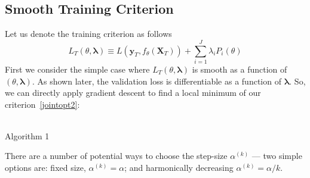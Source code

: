 \documentclass[10pt,letterpaper]{article}
\begin{document}
\subsection{Smooth Training Criterion}
Let us denote the training criterion as follows
\begin{equation}
L_T\left(\theta, \boldsymbol{\lambda}\right) \equiv L(\boldsymbol{y}_T, f_\theta (\boldsymbol{X}_T)) + \sum\limits_{i=1}^J \lambda_i P_i(\theta)
\label{train}
\end{equation}
First we consider the simple case where $L_T\left(\theta, \boldsymbol{\lambda}\right)$ is smooth as a function of $(\theta, \boldsymbol{\lambda})$. As shown later, the validation loss is differentiable as a function of $\boldsymbol{\lambda}$. So, we can directly apply gradient descent to find a local minimum of our criterion~\eqref{jointopt2}:
\begin{center}
  \\
  Algorithm 1
\end{center}
There are a number of potential ways to choose the step-size $\alpha^{(k)}$ --- two simple options are: fixed size, $\alpha^{(k)} = \alpha$; and harmonically decreasing $\alpha^{(k)} = \alpha/k$.\\
\vspace{1mm}
\end{document}
